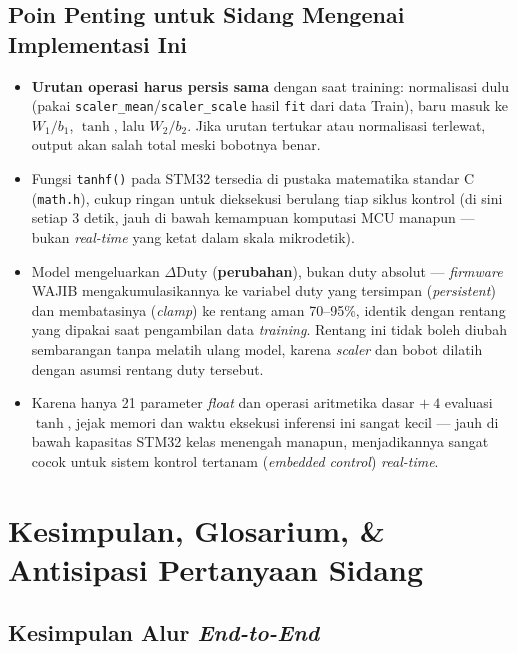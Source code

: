 \documentclass[11pt,a4paper]{article}
\begin{document}
\subsection{Poin Penting untuk Sidang Mengenai Implementasi Ini}

\begin{itemize}[nosep]
  \item \textbf{Urutan operasi harus persis sama} dengan saat training: normalisasi
  dulu (pakai \texttt{scaler\_mean}/\texttt{scaler\_scale} hasil \texttt{fit} dari data
  Train), baru masuk ke $W_1/b_1$, $\tanh$, lalu $W_2/b_2$. Jika urutan tertukar atau
  normalisasi terlewat, output akan salah total meski bobotnya benar.
  \item Fungsi \texttt{tanhf()} pada STM32 tersedia di pustaka matematika standar C
  (\texttt{math.h}), cukup ringan untuk dieksekusi berulang tiap siklus kontrol (di sini
  setiap 3 detik, jauh di bawah kemampuan komputasi MCU manapun --- bukan \emph{real-time}
  yang ketat dalam skala mikrodetik).
  \item Model mengeluarkan $\Delta\mathrm{Duty}$ (\textbf{perubahan}), bukan duty
  absolut --- \emph{firmware} WAJIB mengakumulasikannya ke variabel duty yang tersimpan
  (\emph{persistent}) dan membatasinya (\emph{clamp}) ke rentang aman 70--95\%, identik
  dengan rentang yang dipakai saat pengambilan data \emph{training}. Rentang ini tidak
  boleh diubah sembarangan tanpa melatih ulang model, karena \emph{scaler} dan bobot
  dilatih dengan asumsi rentang duty tersebut.
  \item Karena hanya 21 parameter \emph{float} dan operasi aritmetika dasar $+\ 4$
  evaluasi $\tanh$, jejak memori dan waktu eksekusi inferensi ini sangat kecil --- jauh
  di bawah kapasitas STM32 kelas menengah manapun, menjadikannya sangat cocok untuk
  sistem kontrol tertanam (\emph{embedded control}) \emph{real-time}.
\end{itemize}

\section{Kesimpulan, Glosarium, \& Antisipasi Pertanyaan Sidang}

\subsection{Kesimpulan Alur \emph{End-to-End}}
\end{document}
